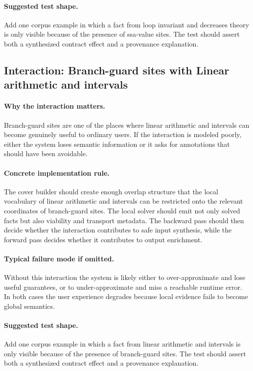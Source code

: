\documentclass[11pt]{report}
\theoremstyle{definition}
\theoremstyle{plain}
\begin{document}
\paragraph{Suggested test shape.}
Add one corpus example in which a fact from loop invariant and decreases theory is only
visible because of the presence of ssa-value sites. The test should
assert both a synthesized contract effect and a provenance explanation.

\subsection{Interaction: Branch-guard sites with Linear arithmetic and intervals}

\paragraph{Why the interaction matters.}
Branch-guard sites are one of the places where linear arithmetic and intervals can become
genuinely useful to ordinary users. If the interaction is modeled poorly,
either the system loses semantic information or it asks for annotations that
should have been avoidable.

\paragraph{Concrete implementation rule.}
The cover builder should create enough overlap structure that the local
vocabulary of linear arithmetic and intervals can be restricted onto the relevant
coordinates of branch-guard sites. The local solver should emit not only
solved facts but also viability and transport metadata. The backward pass
should then decide whether the interaction contributes to safe input
synthesis, while the forward pass decides whether it contributes to output
enrichment.

\paragraph{Typical failure mode if omitted.}
Without this interaction the system is likely either to over-approximate and
lose useful guarantees, or to under-approximate and miss a reachable runtime
error. In both cases the user experience degrades because local evidence
fails to become global semantics.

\paragraph{Suggested test shape.}
Add one corpus example in which a fact from linear arithmetic and intervals is only
visible because of the presence of branch-guard sites. The test should
assert both a synthesized contract effect and a provenance explanation.
\end{document}
